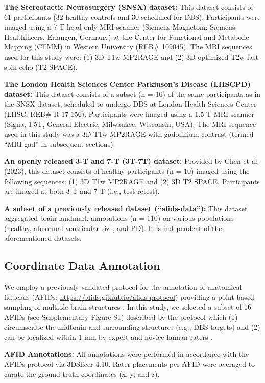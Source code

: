 \textbf{The Stereotactic Neurosurgery (SNSX) dataset:} This dataset consists of 61 participants (32 healthy controls and 30 scheduled for DBS). Participants were imaged using a 7-T head-only MRI scanner (Siemens Magnetom; Siemens Healthineers, Erlangen, Germany) at the Center for Functional and Metabolic Mapping (CFMM) in Western University (REB\# 109045). The MRI sequences used for this study were: (1) 3D T1w MP2RAGE and (2) 3D optimized T2w fast-spin echo (T2 SPACE).

\textbf{The London Health Sciences Center Parkinson’s Disease (LHSCPD) dataset:} This dataset consists of a subset (n = 10) of the same participants as in the SNSX dataset, scheduled to undergo DBS at London Health Sciences Center (LHSC; REB\# R-17-156). Participants were imaged using a 1.5-T MRI scanner (Signa, 1.5T, General Electric, Milwaukee, Wisconsin, USA). The MRI sequence used in this study was a 3D T1w MP2RAGE with gadolinium contrast (termed “MRI-gad” in subsequent sections).

\textbf{An openly released 3-T and 7-T (3T-7T) dataset:} Provided by Chen et al. (2023), this dataset consists of healthy participants (n = 10) imaged using the following sequences: (1) 3D T1w MP2RAGE and (2) 3D T2 SPACE. Participants are imaged at both 3-T and 7-T (i.e., test-retest).

\textbf{A subset of a previously released dataset (“afids-data”):} This dataset \cite{ref} aggregated brain landmark annotations (n = 110) on various populations (healthy, abnormal ventricular size, and PD). It is independent of the aforementioned datasets.

\subsection{Coordinate Data Annotation}
We employ a previously validated protocol for the annotation of anatomical fiducials (AFIDs; \url{https://afids.github.io/afids-protocol}) providing a point-based sampling of multiple brain structures \cite{lau2019}. In this study, we selected a subset of 16 AFIDs (see Supplementary Figure S1) described by the protocol which (1) circumscribe the midbrain and surrounding structures (e.g., DBS targets) and (2) can be localized within 1 mm by expert and novice human raters \cite{ref}.

\textbf{AFID Annotations:} All annotations were performed in accordance with the AFIDs protocol via 3DSlicer 4.10. Rater placements per AFID were averaged to curate the ground-truth coordinates (x, y, and z).

